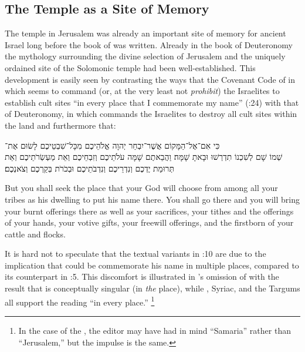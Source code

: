 \subsection{The Temple as a Site of Memory}
The temple in Jerusalem was already an important site of memory for ancient Israel long before the book of \chronicles was written. Already in the book of Deuteronomy the mythology surrounding the divine selection of Jerusalem and the uniquely ordained site of the Solomonic temple had been well-established. This development is easily seen by contrasting the ways that the Covenant Code of  in which \yahweh seems to command (or, at the very least not \emph{prohibit}) the Israelites to establish cult sites  ``in every place that I commemorate my name'' (:24) with that of Deuteronomy, in which \yahweh commands the Israelites to destroy all cult sites within the land and furthermore that: 
\begin{hebrewtext}
    כִּי אִם־אֶל־הַמָּקוֹם אֲשֶׁר־יִבְחַר יְהוָה אֱלֹהֵיכֶם מִכָּל־שִׁבְטֵיכֶם לָשׂוּם אֶת־\\שְׁמוֹ שָׁם לְשִׁכְנוֹ תִדְרְשׁוּ וּבָאתָ שָׁמָּה׃
    וַהֲבֵאתֶם שָׁמָּה עֹלֹתֵיכֶם וְזִבְחֵיכֶם וְאֵת מַעְשְׂרֹתֵיכֶם וְאֵת תְּרוּמַת יֶדְכֶם וְנִדְרֵיכֶם וְנִדְבֹתֵיכֶם וּבְכֹרֹת בְּקַרְכֶם וְצֹאנְכֶם׃
\end{hebrewtext}
\begin{translation}
    But you shall seek the place that \yahweh your God will choose from among all your tribes as his dwelling to put his name there. You shall go there
    and you will bring your burnt offerings there as well as your sacrifices, your tithes and the offerings of your hands, your votive gifts, your freewill offerings, and the firstborn of your cattle and flocks. 
\end{translation}
\noindent
It is hard not to speculate that the textual variants in :10 are due to the implication that \yahweh could be commemorate his name in multiple places, compared to its counterpart in :5. This discomfort is illustrated in  \sampent's omission of  with the result that  is conceptually singular (in \emph{the} place), while \lxx, Syriac, and the Targums all support the reading ``in every place.''%
    \footnote{In the case of the \sampent, the editor may have had in mind ``Samaria'' rather than ``Jerusalem,'' but the impulse is the same.}
